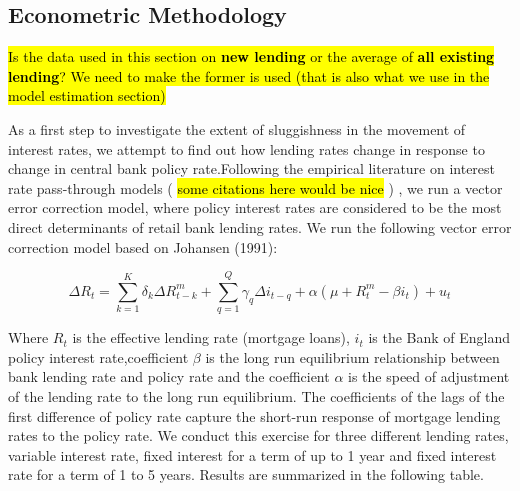 \documentclass[12pt]{article}
\numberwithin{equation}{section}
\begin{document}
\subsection{Econometric Methodology}

\hl{Is the data used in this section on \textbf{new lending} or the average of \textbf{all existing lending}? We need to make the former is used (that is also what we use in the model estimation section) } 




As a first step to investigate the extent of sluggishness in the movement of interest rates, we attempt  to find out how lending rates change in response to change in central bank policy rate.Following the empirical literature on interest rate pass-through models ( \hl{some citations here would be nice} ) , we run a vector error correction model, where policy interest rates  are considered to be the most direct determinants of retail bank lending rates. We run the following vector error correction model based on Johansen (1991): 

\begin{equation}
{\Delta}R_{t}=\sum _{k=1}^{K }\delta_{k}{\Delta}R^m_{t-k}+\sum _{q=1}^{Q }\gamma_{q}{\Delta}i_{t-q}+\alpha (\mu+R^m_{t}-\beta i_{t})+u_{t}	
\end{equation}

Where $R_{t}$ is the effective lending rate (mortgage loans), $i_{t}$ is the Bank of England policy interest rate,coefficient $\beta$ is the long run equilibrium relationship between bank lending rate and policy rate and the coefficient $\alpha$ is the speed of adjustment of the lending rate to the long run equilibrium. The coefficients of the lags of the first difference of policy rate capture the short-run response of mortgage lending rates to the policy rate. We conduct this exercise for three different lending rates, variable interest rate, fixed interest for a term of up to 1 year and fixed interest rate for a term of 1 to 5 years. Results are summarized in the following table.
\end{document}
